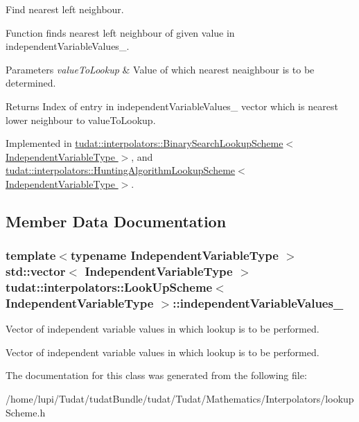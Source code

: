 Find nearest left neighbour. 

Function finds nearest left neighbour of given value in independent\+Variable\+Values\+\_\+. 
\begin{DoxyParams}{Parameters}
{\em value\+To\+Lookup} & Value of which nearest neaighbour is to be determined. \\
\hline
\end{DoxyParams}
\begin{DoxyReturn}{Returns}
Index of entry in independent\+Variable\+Values\+\_\+ vector which is nearest lower neighbour to value\+To\+Lookup. 
\end{DoxyReturn}


Implemented in \hyperlink{classtudat_1_1interpolators_1_1BinarySearchLookupScheme_a9c91bd06d198e6a5dc2a15ad7314c91f}{tudat\+::interpolators\+::\+Binary\+Search\+Lookup\+Scheme$<$ Independent\+Variable\+Type $>$}, and \hyperlink{classtudat_1_1interpolators_1_1HuntingAlgorithmLookupScheme_a52750dd9d4c1b1177459ee5630b24451}{tudat\+::interpolators\+::\+Hunting\+Algorithm\+Lookup\+Scheme$<$ Independent\+Variable\+Type $>$}.



\subsection{Member Data Documentation}
\subsubsection[{\texorpdfstring{independent\+Variable\+Values\+\_\+}{independentVariableValues_}}]{\setlength{\rightskip}{0pt plus 5cm}template$<$typename Independent\+Variable\+Type $>$ std\+::vector$<$ Independent\+Variable\+Type $>$ {\bf tudat\+::interpolators\+::\+Look\+Up\+Scheme}$<$ Independent\+Variable\+Type $>$\+::independent\+Variable\+Values\+\_\+\hspace{0.3cm}{\ttfamily [protected]}}\hypertarget{classtudat_1_1interpolators_1_1LookUpScheme_a753a3db9ce3acfe0bbb4272155360ab7}{}\label{classtudat_1_1interpolators_1_1LookUpScheme_a753a3db9ce3acfe0bbb4272155360ab7}


Vector of independent variable values in which lookup is to be performed. 

Vector of independent variable values in which lookup is to be performed. 

The documentation for this class was generated from the following file\+:\begin{DoxyCompactItemize}
\item 
/home/lupi/\+Tudat/tudat\+Bundle/tudat/\+Tudat/\+Mathematics/\+Interpolators/lookup\+Scheme.\+h\end{DoxyCompactItemize}
